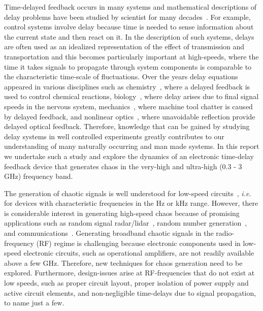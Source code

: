 \documentclass[aps,twocolumn,pre,nofootinbib]{revtex4}
\begin{document}
 Time-delayed feedback occurs in many systems and mathematical descriptions of delay problems have been studied by scientist for many decades~\cite{Tinbergen1931,Frisch1935,Hutchinson1948}.  For example, control systems involve delay because time is needed to sense information about the current state and then react on it. 
 In the description of such systems, delays are often used as an idealized representation of the effect of transmission and transportation and this becomes particularly important at high-speeds, where the time it takes signals to propagate through system components is comparable to the characteristic time-scale of fluctuations. 
 Over the years delay equations appeared in various disciplines such as chemistry~\cite{Epstein1998}, where a delayed feedback is used to control chemical reactions, biology~\cite{Keener1998,Murray2002}, where delay arises due to final signal speeds in the nervous system, mechanics~\cite{Stepan1989}, where machine tool chatter is caused by delayed feedback, and nonlinear optics~\cite{Newell1992}, where unavoidable reflection provide delayed optical feedback. 
 Therefore, knowledge that can be gained by studying delay systems in well controlled experiments greatly contributes to our understanding of many naturally occurring and man made systems.
 In this report we undertake such a study and explore the dynamics of an electronic time-delay feedback device that generates chaos in the very-high and ultra-high (0.3 - 3 GHz) frequency band. 
  

The generation of chaotic signals is well understood for low-speed circuits~\cite{Carroll1995}, {\it i.e.} for devices with characteristic frequencies in the Hz or kHz range. However, there is considerable interest in generating high-speed chaos because of promising applications such as random signal radar/lidar~\cite{myneni2001,lukin2001,lin2004,lin2004a}, random number generation~\cite{Stojanovski2001,Gerosa2002,Gleeson2002}, and communications~\cite{VanWiggeren1998,Fischer2000,Kusumoto2002,Dronov2004,Argyris2005,Abarbanel2001}. Generating broadband chaotic signals in the radio-frequency (RF) regime is challenging because electronic components used in low-speed electronic circuits, such as operational amplifiers, are not readily available above a few GHz. Therefore, new techniques for chaos generation need to be explored. Furthermore, design-issues arise at RF-frequencies that do not exist at low speeds, such as proper circuit layout, proper isolation of power supply and active circuit elements, and non-negligible time-delays due to signal propagation, to name just a few.
  
\end{document}
